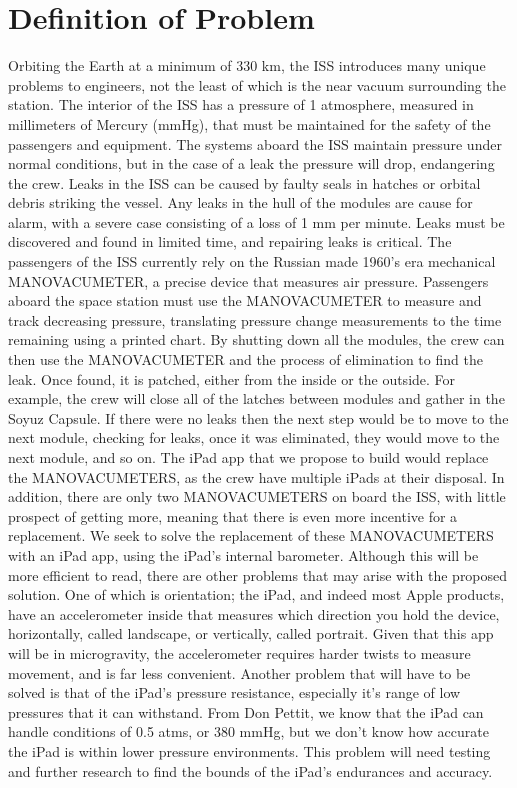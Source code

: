 \documentclass[onecolumn, draftclsnofoot,10pt, compsoc]{IEEEtran}
\begin{document}
\section{Definition of Problem}
Orbiting the Earth at a minimum of 330 km, the ISS introduces many unique problems to engineers, not the least of which is the near vacuum surrounding the station.
The interior of the ISS has a pressure of 1 atmosphere, measured in millimeters of Mercury (mmHg), that must be maintained for the safety of the passengers and equipment.
The systems aboard the ISS maintain pressure under normal conditions, but in the case of a leak the pressure will drop, endangering the crew.  Leaks in the ISS can be caused by faulty seals in hatches or orbital debris striking the vessel.
Any leaks in the hull of the modules are cause for alarm, with a severe case consisting of a loss of 1 mm per minute.
Leaks must be discovered and found in limited time, and repairing leaks is critical.
The passengers of the ISS currently rely on the Russian made 1960's era mechanical MANOVACUMETER, a precise device that measures air pressure.
Passengers aboard the space station must use the MANOVACUMETER to measure and track decreasing pressure, translating pressure change measurements to the time remaining using a printed chart.
By shutting down all the modules, the crew can then use the MANOVACUMETER and the process of elimination to find the leak.
Once found, it is patched, either from the inside or the outside.
For example, the crew will close all of the latches between modules and gather in the Soyuz Capsule.
If there were no leaks then the next step would be to move to the next module, checking for leaks, once it was eliminated, they would move to the next module, and so on.
The iPad app that we propose to build would replace the MANOVACUMETERS, as the crew have multiple iPads at their disposal.
In addition, there are only two MANOVACUMETERS on board the ISS, with little prospect of getting more, meaning that there is even more incentive for a replacement.
We seek to solve the replacement of these MANOVACUMETERS with an iPad app, using the iPad's internal barometer.
Although this will be more efficient to read, there are other problems that may arise with the proposed solution.
One of which is orientation; the iPad, and indeed most Apple products, have an accelerometer inside that measures which direction you hold the device, horizontally, called landscape, or vertically, called portrait.
Given that this app will be in microgravity, the accelerometer requires harder twists to measure movement, and is far less convenient.
Another problem that will have to be solved is that of the iPad's pressure resistance, especially it's range of low pressures that it can withstand.
From Don Pettit, we know that the iPad can handle conditions of 0.5 atms, or 380 mmHg, but we don't know how accurate the iPad is within lower pressure environments.
This problem will need testing and further research to find the bounds of the iPad's endurances and accuracy.
\end{document}
